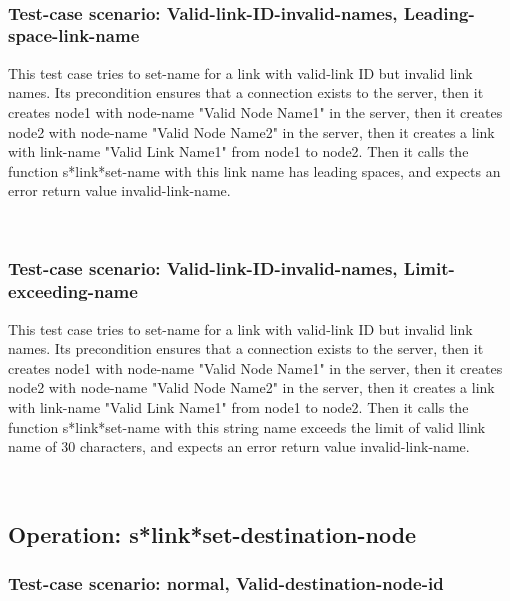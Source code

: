 \
\subsubsection {Test-case scenario: Valid-link-ID-invalid-names, Leading-space-link-name}


This test case tries to set-name for a link with valid-link ID but invalid link names.
Its precondition ensures that a connection exists to the server, then it creates node1 with node-name "Valid Node Name1" in the server, then it creates node2 with node-name  "Valid Node Name2" in the server, then it creates a link with link-name "Valid Link Name1" from node1 to node2.
Then it calls the function s*link*set-name  with this link name has leading spaces, and expects an error return value invalid-link-name.





\
\subsubsection {Test-case scenario: Valid-link-ID-invalid-names, Limit-exceeding-name}


This test case tries to set-name for a link with valid-link ID but invalid link names.
Its precondition ensures that a connection exists to the server, then it creates node1 with node-name "Valid Node Name1" in the server, then it creates node2 with node-name  "Valid Node Name2" in the server, then it creates a link with link-name "Valid Link Name1" from node1 to node2.
Then it calls the function s*link*set-name  with this string name exceeds the limit of valid llink name of 30 characters, and expects an error return value invalid-link-name.





\
\subsection {Operation: s*link*set-destination-node}
\subsubsection {Test-case scenario: normal, Valid-destination-node-id}



